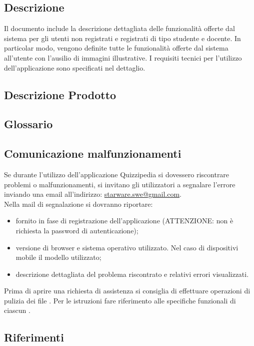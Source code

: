 \documentclass[12pt,a4paper]{article}
\begin{document}
	\subsection{Descrizione}
    Il documento include la descrizione dettagliata delle funzionalità offerte dal sistema per gli utenti non registrati e registrati di tipo studente e docente. In particolar modo, vengono definite tutte le funzionalità offerte dal sistema all’utente con l’ausilio di immagini illustrative. 
    I requisiti tecnici per l'utilizzo dell'applicazione \prj{} sono specificati nel dettaglio.
	
	\subsection{Descrizione Prodotto}
	\descrizioneProdotto
	
	\subsection{Glossario}
	\glossarioManualiPrint
	\subsection{Comunicazione malfunzionamenti}
	Se durante l’utilizzo dell’applicazione Quizzipedia si dovessero riscontrare problemi o 	malfunzionamenti, si invitano gli utilizzatori a segnalare l’errore inviando una email all’indirizzo:
	\url{starware.swe@gmail.com}. \\
	Nella mail di segnalazione si dovranno riportare:
	\begin{itemize}
		\item {} fornito in fase di registrazione dell’applicazione (ATTENZIONE: non è richiesta la password di autenticazione);
		\item versione di browser e sistema operativo utilizzato. Nel caso di dispositivi mobile il modello utilizzato;
		\item descrizione dettagliata del problema riscontrato e relativi errori visualizzati.
	\end{itemize}
	Prima di aprire una richiesta di assistenza si consiglia di effettuare operazioni di pulizia dei file . Per le istruzioni fare riferimento alle specifiche funzionali di ciascun .
	
	\subsection{Riferimenti}
	
\end{document}
